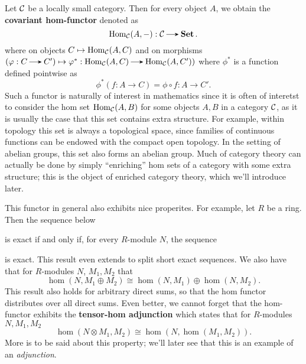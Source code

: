     \begin{example}
        Let $\mathcal{C}$ be a locally small category. Then for every object $A$, 
        we obtain the \textbf{covariant hom-functor} denoted as 
        \[
            \hom_{\cc}(A, -): \cc \to \Set.
        \]
        where on objects $C \mapsto \operatorname{\mathrm{Hom}}_{\mathcal{C}}(A, C)$ and on morphisms 
        $(\phi: C \to C') \mapsto \phi^*: \hom_{\cc}(A, C) \to \hom_{\cc}(A, C'))$
        where  $\phi^*$ is a function defined pointwise as 
        \[
            \phi^*(f: A \to C) = \phi \circ f: A \to C'.
        \]
        Such a functor is naturally of interest in mathematics since it is often 
        of interetst to consider the hom set $\operatorname{\mathrm{Hom}}_{\mathcal{C}}(A, B)$ for some objects $A, B$ 
        in a category $\mathcal{C}$, as it is usually the case that this set contains extra structure.
        For example, within topology this set is always a topological space, since 
        families of continuous functions can be endowed with the compact open topology.
        In the setting of abelian groups, this set also forms an abelian group. Much of category 
        theory can actually be done by simply ``enriching'' hom sets of a category with 
        some extra structure; this is the object of enriched category theory, which we'll introduce later.

        This functor in general also exhibits nice properites. For example, 
        let $R$ be a ring. Then the sequence below
        \begin{center}
        \end{center}
        is exact if and only if, for every $R$-module $N$, the sequence 
        \begin{center}
        \end{center}
        is exact. This result even extends to split short exact sequences. We 
        also have that for $R$-modules $N$, $M_1, M_2$ that 
        \[
            \hom(N, M_1\oplus M_2)\cong \hom(N, M_1)\oplus \hom(N, M_2).
        \]
        This result also holds for arbitrary direct sums,
        so that the hom functor distributes over all direct sums.
        Even better, we cannot forget that the hom-functor exhibits the 
        \textbf{tensor-hom adjunction} which states that for
        $R$-modules $N, M_1, M_2$ 
        \[
            \hom(N \otimes M_1, M_2) \cong \hom(N, \hom(M_1, M_2)).
        \]
        More is to be said about this property; we'll later 
        see that this is an example of an \emph{adjunction}.


    \end{example}





